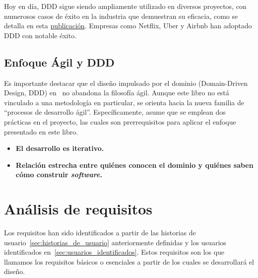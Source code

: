 Hoy en día, DDD sigue siendo ampliamente utilizado en diversos proyectos, con numerosos casos de éxito en la industria que demuestran su eficacia, como se detalla en esta \href{https://blog.bitsrc.io/demystifying-domain-driven-design-ddd-in-modern-software-architecture-b57e27c210f7}{publicación}. Empresas como Netflix, Uber y Airbnb han adoptado DDD con notable éxito.

\subsection{Enfoque Ágil y DDD}

Es importante destacar que el diseño impulsado por el dominio (Domain-Driven Design, DDD) en~\cite{evans2004domain} no abandona la filosofía ágil. Aunque este libro no está vinculado a una metodología en particular, se orienta hacia la nueva familia de ``procesos de desarrollo ágil''. Específicamente, asume que se emplean dos prácticas en el proyecto, las cuales son prerrequisitos para aplicar el enfoque presentado en este libro.

\begin{itemize}
    \item \textbf{El desarrollo es iterativo.}
    \item \textbf{Relación estrecha entre quiénes conocen el dominio y quiénes saben cómo construir \textit{software}.}
\end{itemize}

\section{Análisis de requisitos}

Los requisitos han sido identificados a partir de las historias de usuario~\ref{sec:historias_de_usuario} anteriormente definidas y los usuarios identificados en~\ref{sec:usuarios_identificados}. Estos requisitos son los que llamamos los requisitos básicos o esenciales a partir de los cuales se desarrollará el diseño.

